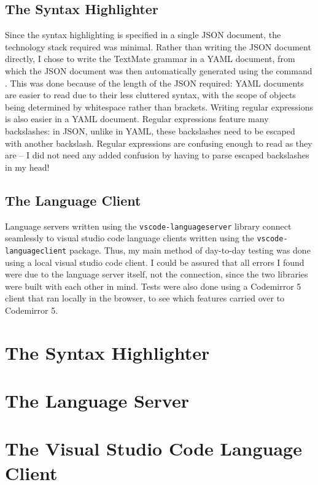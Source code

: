 \documentclass[../main.tex]{subfiles}
\begin{document}
\subsection{The Syntax Highlighter}
Since the syntax highlighting is specified in a single JSON document, the technology stack required was minimal. Rather than writing the JSON document directly, I chose to write the TextMate grammar in a YAML document, from which the JSON document was then automatically generated using the command  \cite{yq_repo}. This was done because of the length of the JSON required: YAML documents are easier to read due to their less cluttered syntax, with the scope of objects being determined by whitespace rather than brackets. Writing regular expressions is also easier in a YAML document. Regular expressions feature many backslashes: in JSON, unlike in YAML, these backslashes need to be escaped with another backslash. Regular expressions are confusing enough to read as they are -- I did not need any added confusion by having to parse escaped backslashes in my head!

\subsection{The Language Client}
Language servers written using the \texttt{vscode-languageserver} library connect seamlessly to visual studio code language clients written using the \texttt{vscode-languageclient} package. Thus, my main method of day-to-day testing was done using a local visual studio code client. I could be assured that all errors I found were due to the language server itself, not the connection, since the two libraries were built with each other in mind. Tests were also done using a Codemirror 5 client that ran locally in the browser, to see which features carried over to Codemirror 5.



\section{The Syntax Highlighter}

\section{The Language Server}

\section{The Visual Studio Code Language Client}
\end{document}
